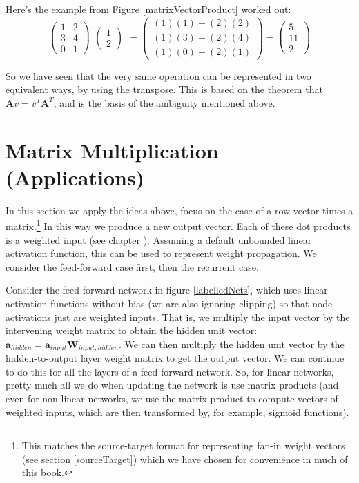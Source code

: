 Here's the example from Figure \ref{matrixVectorProduct} worked out:
\[
  \begin{pmatrix}
    1 & 2 \\
    3 & 4 \\
    0 & 1
  \end{pmatrix}
    \begin{matrix}
    \begin{pmatrix}1\\2\end{pmatrix}
  \end{matrix}
  =
  \begin{pmatrix}
    (1)(1) + (2)(2) \\
    (1)(3) + (2)(4) \\
    (1)(0) + (2)(1)
  \end{pmatrix}
  =
  \begin{pmatrix}
    5 \\
    11 \\
    2
  \end{pmatrix}
\]
\vspace*{.1cm}


So we have seen that the very same operation can be represented in two equivalent ways, by using the transpose. This is based on the theorem that  $\mathbf{A}v =  v^T\mathbf{A}^T$, and is the basis of the ambiguity mentioned above. 

\section{Matrix Multiplication (Applications)}


In this section we apply the ideas above, focus on the case of a row vector times a matrix.\footnote{This matches the source-target format for representing fan-in weight vectors (see section \ref{sourceTarget}) which we have chosen for convenience in much of this book.} In this way we produce a new output vector. Each of these dot products is a weighted input (see chapter ). Assuming a default unbounded linear activation function, this can be used to represent weight propagation. We consider the feed-forward case first, then the recurrent case.

Consider the feed-forward network in figure \ref{labelledNets}, which uses linear activation functions without bias (we are also ignoring clipping) so that node activations just are weighted inputs. That is, we multiply the input vector by the intervening weight matrix to obtain the hidden unit vector:  $\textbf{a}_{hidden} = \textbf{a}_{input} \textbf{W}_{input,hidden}$. We can then multiply the hidden unit vector by the hidden-to-output layer weight matrix to get the output vector. We can continue to do this for all the layers of a feed-forward network. So, for linear networks, pretty much all we do when updating the network is use matrix products (and even for non-linear networks, we use the matrix product to compute vectors of weighted inputs, which are then transformed by, for example, sigmoid functions).

